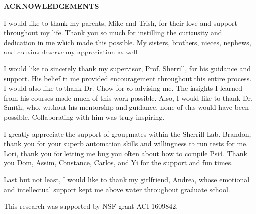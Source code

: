 \clearpage
\begin{centering}
\textbf{ACKNOWLEDGEMENTS}\\
\vspace{\baselineskip}
\end{centering}


\noindent I would like to thank my parents, Mike and Trish, for their love and support throughout my life.
Thank you so much for instilling the curiousity and dedication in me which made this possible.
My sisters, brothers, nieces, nephews, and cousins deserve my appreciation as well.

\hfill

\noindent I would like to sincerely thank my supervisor, Prof. Sherrill, for his guidance and support.
His belief in me provided encouragement throughout this entire process. I would also like to
thank Dr. Chow for co-advising me. The insights I learned from his courses made much of this work
possible. Also, I would like to thank Dr. Smith, who, without his mentorship and guidance, none
of this would have been possible. Collaborating with him was truly inspiring.

\hfill

\noindent I greatly appreciate the support of groupmates within the Sherrill Lab. Brandon, thank you for
your superb automation skills and willingness to run tests for me. Lori, thank you for letting me bug you often about
how to compile Psi4. Thank you Dom, Assim, Constance, Carlos, and Yi for the support and fun times. 

\hfill

\noindent Last but not least, I would like to thank my girlfriend, Andrea, whose emotional and intellectual support
kept me above water throughout graduate school.

\hfill

\noindent This research was supported by NSF grant ACI-1609842. 
\clearpage
